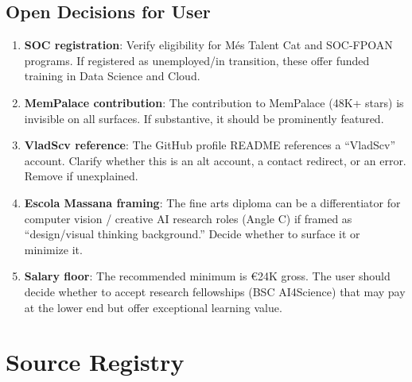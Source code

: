 \documentclass[a4paper,11pt,openany]{report}
\begin{document}
\section{Open Decisions for User}

\begin{enumerate}
  \item \textbf{SOC registration}: Verify eligibility for Més Talent Cat and
    SOC-FPOAN programs. If registered as unemployed/in transition, these
    offer funded training in Data Science and Cloud.
  \item \textbf{MemPalace contribution}: The contribution to MemPalace
    (48K+ stars) is invisible on all surfaces. If substantive, it should be
    prominently featured.
  \item \textbf{VladScv reference}: The GitHub profile README references a
    ``VladScv'' account. Clarify whether this is an alt account, a contact
    redirect, or an error. Remove if unexplained.
  \item \textbf{Escola Massana framing}: The fine arts diploma can be a
    differentiator for computer vision / creative AI research roles (Angle C)
    if framed as ``design/visual thinking background.'' Decide whether to
    surface it or minimize it.
  \item \textbf{Salary floor}: The recommended minimum is €24K gross. The
    user should decide whether to accept research fellowships (BSC AI4Science)
    that may pay at the lower end but offer exceptional learning value.
\end{enumerate}



\appendix
\chapter{Source Registry}
\label{app:sources}

\end{document}
